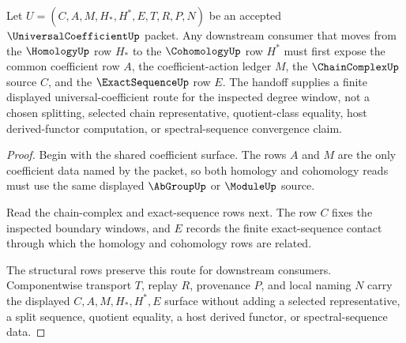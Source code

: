 \begin{theorem}
\label{thm:universal-coefficient-homology-cohomology-handoff}
Let $U=(C,A,M,H_*,H^*,E,T,R,P,N)$ be an accepted $\UniversalCoefficientUp$ packet. Any downstream consumer that moves from the $\HomologyUp$ row $H_*$ to the $\CohomologyUp$ row $H^*$ must first expose the common coefficient row $A$, the coefficient-action ledger $M$, the $\ChainComplexUp$ source $C$, and the $\ExactSequenceUp$ row $E$. The handoff supplies a finite displayed universal-coefficient route for the inspected degree window, not a chosen splitting, selected chain representative, quotient-class equality, host derived-functor computation, or spectral-sequence convergence claim.
\end{theorem}
\begin{proof}
Begin with the shared coefficient surface. The rows $A$ and $M$ are the only coefficient data named by the packet, so both homology and cohomology reads must use the same displayed $\AbGroupUp$ or $\ModuleUp$ source.

Read the chain-complex and exact-sequence rows next. The row $C$ fixes the inspected boundary windows, and $E$ records the finite exact-sequence contact through which the homology and cohomology rows are related.

The structural rows preserve this route for downstream consumers. Componentwise transport $T$, replay $R$, provenance $P$, and local naming $N$ carry the displayed $C,A,M,H_*,H^*,E$ surface without adding a selected representative, a split sequence, quotient equality, a host derived functor, or spectral-sequence data.
\end{proof}


\begin{closurestatus}{\UniversalCoefficientUp}
  \theoryclosure{\seedClosure}
  \formalstatus{\unformalizedV}
\end{closurestatus}

